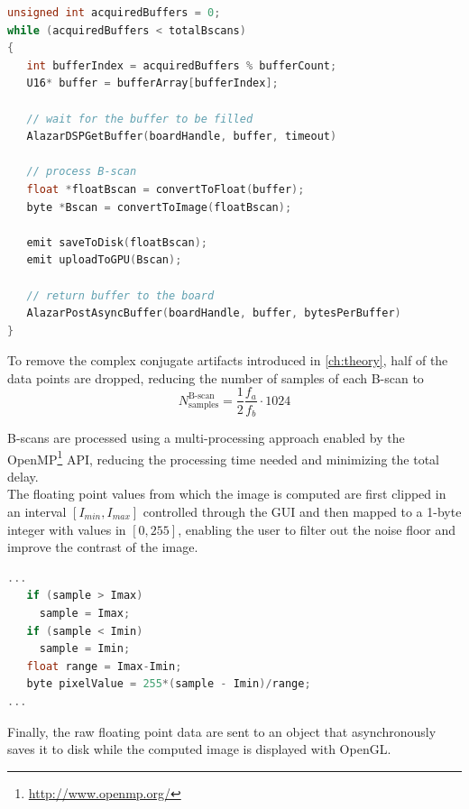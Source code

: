 \begin{lstlisting}[language=C,frame=tb]
unsigned int acquiredBuffers = 0;
while (acquiredBuffers < totalBscans)
{
   int bufferIndex = acquiredBuffers % bufferCount;
   U16* buffer = bufferArray[bufferIndex];
	
   // wait for the buffer to be filled
   AlazarDSPGetBuffer(boardHandle, buffer, timeout)

   // process B-scan
   float *floatBscan = convertToFloat(buffer);
   byte *Bscan = convertToImage(floatBscan);
   
   emit saveToDisk(floatBscan);
   emit uploadToGPU(Bscan);
   
   // return buffer to the board
   AlazarPostAsyncBuffer(boardHandle, buffer, bytesPerBuffer)
}
\end{lstlisting}

To remove the complex conjugate artifacts introduced in \autoref{ch:theory}, half of the data points are dropped, reducing the number of samples of each B-scan to 
\begin{equation}
	N_{\text{samples}}^{\text{B-scan}} = \frac{1}{2} \frac{f_a}{f_b} \cdot 1024
\end{equation}

B-scans are processed using a multi-processing approach enabled by the OpenMP\footnote{\url{http://www.openmp.org/}} \ac{API}, reducing the processing time needed and minimizing the total delay. \\

The floating point values from which the image is computed are first clipped in an interval $[I_{min}, I_{max}]$ controlled through the \ac{GUI} and then mapped to a 1-byte integer with values in $[0, 255]$, enabling the user to filter out the noise floor and improve the contrast of the image. 
\begin{lstlisting}[language=C,frame=tb]
...
   if (sample > Imax)
     sample = Imax;
   if (sample < Imin)
     sample = Imin;
   float range = Imax-Imin;
   byte pixelValue = 255*(sample - Imin)/range;
...
\end{lstlisting}

Finally, the raw floating point data are sent to an object that asynchronously saves it to disk while the computed image is displayed with OpenGL. 

